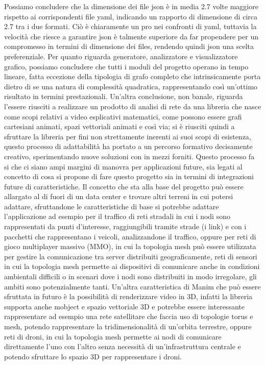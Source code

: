\documentclass[binding=0.6cm]{sapthesis}
\begin{document}
Possiamo concludere che la dimensione dei file json è in media 2.7 volte maggiore rispetto ai corrispondenti file yaml, 
indicando un rapporto di dimensione di circa 2.7 tra i due formati. Ciò è chiaramente un pro nei confronti di yaml, tuttavia la velocità che riesce a garantire json è talmente 
superiore da far propendere per un compromesso in termini di dimensione dei files, rendendo quindi json una scelta preferenziale.
Per quanto riguarda generatore, analizzatore e visualizzatore grafico, possiamo concludere che tutti i moduli del progetto operano in tempo lineare, fatta eccezione della tipologia di grafo completo che intrinsicamente porta dietro di se una natura di complessità quadratica,
rappresentando così un'ottimo risultato in termini prestazionali.
Un'altra conclusione, non banale, riguarda l'essere riusciti a realizzare un prodotto di analisi di rete da una libreria che nasce come scopi relativi a video esplicativi matematici, come possono essere grafi cartesiani animati, spazi vettoriali animati e così via;
si è riusciti quindi a sfruttare la libreria per fini non strettamente inerenti ai suoi scopi di esistenza, questo processo di adattabilità ha portato a un percorso formativo decisamente creativo, sperimentando nuove soluzioni con in mezzi forniti.
Questo processo fa si che ci siano ampi margini di manovra per applicazioni future, 
sia legati al concetto di cosa si propone di fare questo progetto sia in termini di integrazioni future di caratteristiche. 
Il concetto che sta alla base del progetto può essere allargato al di fuori di un data center e trovare
altri terreni in cui potersi adattare, sfruttandone le caratteristiche di base si potrebbe adattare l'applicazione ad esempio per il traffico di reti stradali in cui 
i nodi sono rappresentati da punti d'interesse, raggiungibili tramite strade (i link) e con i pacchetti che rappresentano i veicoli, analizzandone il traffico, oppure per reti di gioco multiplayer massivo (MMO), in cui la topologia mesh può essere utilizzata per gestire la comunicazione tra server distribuiti geograficamente, reti di sensori 
in cui la topologia mesh permette ai dispositivi di comunicare anche in condizioni ambientali difficili o in scenari dove i nodi sono distribuiti in modo irregolare, gli ambiti sono potenzialmente tanti.
Un'altra caratteristica di Manim che può essere sfruttata in futuro è la possibilità di renderizzare video in 3D, infatti la libreria supporta anche mobject e spazio vettoriale 3D e potrebbe essere interessante rappresentare ad esempio una rete satellitare che faccia uso di topologie torus e mesh, potendo 
rappresentare la tridimensionalità di un'orbita terrestre, oppure reti di droni, in cui la topologia mesh permette ai nodi di comunicare direttamente l'uno con l'altro senza necessità di un'infrastruttura centrale e potendo sfruttare lo spazio 3D per rappresentare i droni.
\end{document}
